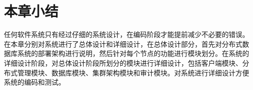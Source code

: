 \section{本章小结}
任何软件系统只有经过仔细的系统设计，在编码阶段才能提前减少不必要的错误。
在本章分别对系统进行了总体设计和详细设计，在总体设计部分，首先对分布式数据库系统的部署架构进行说明，然后针对每个节点的功能进行模块划分。在系统的详细设计阶段，对总体设计阶段所划分的模块进行详细设计，包括客户端模块、分布式管理模块、数据库模块、集群架构模块和审计模块。对系统进行详细设计方便系统的编码和测试。